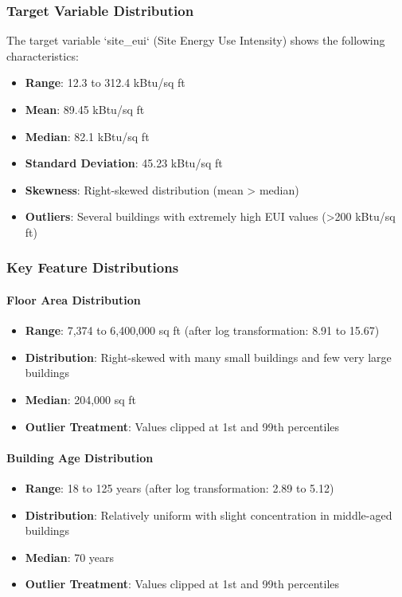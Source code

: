 \subsubsection{Target Variable Distribution}

The target variable `site\_eui` (Site Energy Use Intensity) shows the following characteristics:
\begin{itemize}
    \item \textbf{Range}: 12.3 to 312.4 kBtu/sq ft
    \item \textbf{Mean}: 89.45 kBtu/sq ft
    \item \textbf{Median}: 82.1 kBtu/sq ft
    \item \textbf{Standard Deviation}: 45.23 kBtu/sq ft
    \item \textbf{Skewness}: Right-skewed distribution (mean > median)
    \item \textbf{Outliers}: Several buildings with extremely high EUI values (>200 kBtu/sq ft)
\end{itemize}

\subsubsection{Key Feature Distributions}

\paragraph{Floor Area Distribution}
\begin{itemize}
    \item \textbf{Range}: 7,374 to 6,400,000 sq ft (after log transformation: 8.91 to 15.67)
    \item \textbf{Distribution}: Right-skewed with many small buildings and few very large buildings
    \item \textbf{Median}: 204,000 sq ft
    \item \textbf{Outlier Treatment}: Values clipped at 1st and 99th percentiles
\end{itemize}

\paragraph{Building Age Distribution}
\begin{itemize}
    \item \textbf{Range}: 18 to 125 years (after log transformation: 2.89 to 5.12)
    \item \textbf{Distribution}: Relatively uniform with slight concentration in middle-aged buildings
    \item \textbf{Median}: 70 years
    \item \textbf{Outlier Treatment}: Values clipped at 1st and 99th percentiles
\end{itemize}

